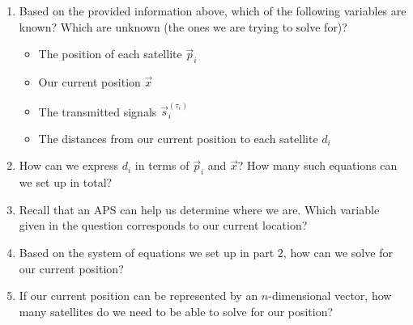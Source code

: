 \begin{enumerate}
    \item Based on the provided information above, which of the following variables are known? Which are unknown (the ones we are trying to solve for)?

        \begin{itemize}
            \item The position of each satellite $\vec{p}_i$
            \item Our current position $\vec{x}$
            \item The transmitted signals $\vec{s}_i^{(\tau_i)}$
            \item The distances from our current position to each satellite $d_i$
        \end{itemize}
    \noindent\fbox{
        \parbox{16cm}{
            \hspace{16cm}
            \vspace{2cm}
        }
    }
    \item How can we express $d_i$ in terms of $\vec{p}_i$ and $\vec{x}$? How many such equations can we set up in total?

    \noindent\fbox{
        \parbox{16cm}{
            \hspace{16cm}
            \vspace{5cm}
        }
    }

    \item Recall that an APS can help us determine where we are. Which variable given in the question corresponds to our current location?
    
    \noindent\fbox{
        \parbox{16cm}{
            \hspace{16cm}
            \vspace{1cm}
        }
    }

    \item Based on the system of equations we set up in part 2, how can we solve for our current position?
    
    \noindent\fbox{
        \parbox{16cm}{
            \hspace{16cm}
            \vspace{6cm}
        }
    }

    \item If our current position can be represented by an $n$-dimensional vector, how many satellites do we need to be able to solve for our position?

    \noindent\fbox{
        \parbox{16cm}{
            \hspace{16cm}
            \vspace{1cm}
        }
    }
    

\end{enumerate}
